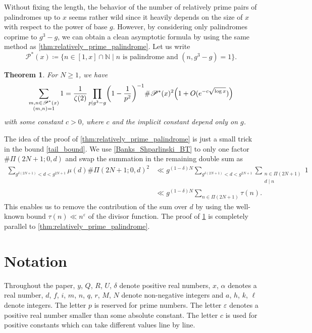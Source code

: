 \documentclass{amsart}
\theoremstyle{plain}
\newtheorem{theorem}{Theorem}
\theoremstyle{definition}
\let\tmp\phi
\let\phi\varphi
\let\varphi\tmp
\let\tmp\epsilon
\let\epsilon\varepsilon
\let\varepsilon\tmp
\begin{document}
Without fixing the length,
the behavior of the number of relatively prime pairs of palindromes up to $x$
seems rather wild since it heavily depends on the size of $x$
with respect to the power of base $g$.
However, by considering only palindromes coprime to $g^{3}-g$,
we can obtain a clean asymptotic formula by using the same method as \cref{thm:relatively_prime_palindrome}.
Let us write
\begin{equation}
\label{def:P_ast}
\mathscr{P}^{\ast}(x)
\coloneqq
\{
n\in[1,x]\cap\mathbb{N}
\mid
\text{$n$ is palindrome and $(n,g^{3}-g)=1$}
\}.
\end{equation}
\begin{theorem}
\label{thm:relatively_prime_palindrome:g3_g}
For $N\ge1$, we have
\[
\sum_{\substack{
m,n\in\mathscr{P}^{\ast}(x)\\
(m,n)=1
}}
1
=
\frac{1}{\zeta(2)}
\prod_{p\mid g^{3}-g}
\biggl(1-\frac{1}{p^{2}}\biggr)^{-1}
\#\mathscr{P}^{\ast}(x)^{2}
\Bigl(1+O(e^{-c\sqrt{\log x}})\Bigr)
\]
with some constant $c>0$,
where $c$ and the implicit constant depend only on $g$.
\end{theorem}

The idea of the proof of \cref{thm:relatively_prime_palindrome}
is just a small trick in the bound \cref{tail_bound}.
We use \cref{Banks_Shparlinski_BT} to only one factor $\#\Pi(2N+1;0,d)$
and swap the summation in the remaining double sum as
\begin{equation}
\label{tail_bound_new}
\begin{aligned}
\sum_{g^{\delta(2N+1)}<d<g^{2N+1}}
\mu(d)\#\Pi(2N+1;0,d)^{2}
&\ll
g^{(1-\delta) N}
\sum_{g^{\delta(2N+1)}<d<g^{2N+1}}
\sum_{\substack{
n\in\Pi(2N+1)\\
d\mid n
}}
1\\
&\ll
g^{(1-\delta)N}
\sum_{n\in\Pi(2N+1)}
\tau(n).
\end{aligned}
\end{equation}
This enables us to remove the contribution of the sum over $d$
by using the well-known bound $\tau(n)\ll n^{\epsilon}$
of the divisor function.
The proof of \cref{thm:relatively_prime_palindrome:g3_g}
is completely parallel to \cref{thm:relatively_prime_palindrome}.

\section{Notation}
\label{sec:notation}
Throughout the paper,
$y$, $Q$, $R$, $U$, $\delta$ denote positive real numbers,
$x$, $\alpha$ denotes a real number,
$d$, $f$, $i$, $m$, $n$, $q$, $r$, $M$, $N$ denote non-negative integers and
$a$, $h$, $k$, $\ell$ denote integers.
The letter $p$ is reserved for prime numbers.
The letter $\epsilon$ denotes a positive real number
smaller than some absolute constant.
The letter $c$ is used for positive constants
which can take different values line by line.
\end{document}
